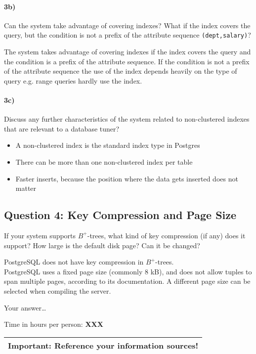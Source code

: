 \documentclass[11pt]{scrartcl}
\begin{document}
\paragraph{3b)} Can the system take advantage of covering indexes? What if the
index covers the query, but the condition is not a prefix of the
attribute sequence {\tt (dept,salary)}?

The system takes advantage of covering indexes if the index covers the query and the condition is a prefix of the attribute sequence. If the condition is not a prefix of the attribute sequence the use of the index depends heavily on the type of query e.g. range queries hardly use the index.

\paragraph{3c)} Discuss any further characteristics of the system related to
non-clustered indexes that are relevant to a database tuner?

\begin{itemize}
 \item A non-clustered index is the standard index type in Postgres
 \item There can be more than one non-clustered index per table
 \item Faster inserts, because the position where the data gets inserted does not matter
\end{itemize}

\subsection*{Question 4: Key Compression and Page Size} If your system
supports $B^+$-trees, what kind of key compression (if any) does it
support?  How large is the default disk page? Can it be changed?

PostgreSQL does not have key compression in $B^+$-trees.\\
PostgreSQL uses a fixed page size (commonly 8 kB), and does not allow tuples to span multiple pages, according to its documentation.
A different page size can be selected when compiling the server.
\smallskip

Your answer\dots


\bigskip

\noindent Time in hours per person: {\bf XXX}

\bigskip

\begin{center}
  \begin{tabular}{c}
    \hline
    {\bf Important:} Reference your information sources!
    \\\hline
  \end{tabular}
\end{center}
\end{document}
